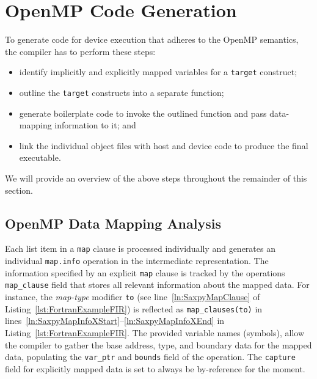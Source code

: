\documentclass[acmtog,natbib=false]{acmart}
\newcommand{\code}[1]{\texttt{#1}\xspace}
\begin{document}

\section{OpenMP Code Generation}
\label{sec:OpenMPCodeGen}

To generate code for device execution that adheres to the OpenMP semantics, the compiler has to perform these steps:

\begin{itemize}
\item identify implicitly and explicitly mapped variables for a \code{target} construct;
\item outline the \code{target} constructs into a separate function;
\item generate boilerplate code to invoke the outlined function and pass data-mapping information to it; and
\item link the individual object files with host and device code to produce the final executable.
\end{itemize}

We will provide an overview of the above steps throughout the remainder of this section.

\subsection{OpenMP Data Mapping Analysis}
\label{sec:OpenMPDataMappingAnalysis}

Each list item in a \code{map} clause is processed individually and generates an individual \code{map.info} operation in the intermediate representation. 
The information specified by an explicit \code{map} clause is tracked by the operations \code{map\_clause} field that stores all relevant information about the mapped data. 
For instance, the \textit{map-type} modifier \code{to} (see line~\ref{ln:SaxpyMapClause} of Listing~\ref{lst:FortranExampleFIR}) is reflected as \code{map\_clauses(to)} in lines~\ref{ln:SaxpyMapInfoXStart}--\ref{ln:SaxpyMapInfoXEnd} in Listing~\ref{lst:FortranExampleFIR}.
The provided variable names (symbols), allow the compiler to gather the base address, type, and boundary data for the mapped data, populating the \code{var\_ptr} and \code{bounds} field of the operation. 
The \code{capture} field for explicitly mapped data is set to always be by-reference for the moment.
\end{document}
